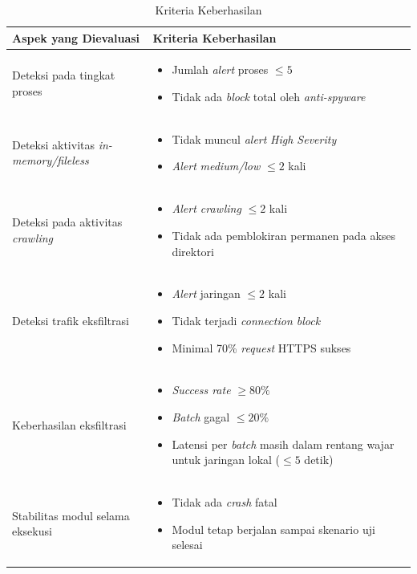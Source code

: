 \begin{table}[H]
\centering
\captionsetup{justification=raggedright,singlelinecheck=false}
\caption{Kriteria Keberhasilan}
\label{tbl:kriteria-keberhasilan}
\begin{tabular}{|p{4.5cm}|p{10.2cm}|}
\hline
\textbf{Aspek yang Dievaluasi} & \textbf{Kriteria Keberhasilan} \\
\hline

Deteksi pada tingkat proses &
\begin{itemize}[leftmargin=*]
    \item Jumlah \textit{alert} proses $\leq 5$ 
    \item Tidak ada \textit{block} total oleh \textit{anti-spyware}
\end{itemize}
\\
\hline

Deteksi aktivitas \textit{in-memory/fileless} &
\begin{itemize}[leftmargin=*]
    \item Tidak muncul \textit{alert} \textit{High Severity}
    \item \textit{Alert} \textit{medium/low} $\leq 2$ kali
\end{itemize}
\\
\hline

Deteksi pada aktivitas \textit{crawling} &
\begin{itemize}[leftmargin=*]
    \item \textit{Alert crawling} $\leq 2$ kali
    \item Tidak ada pemblokiran permanen pada akses direktori
\end{itemize}
\\
\hline

Deteksi trafik eksfiltrasi &
\begin{itemize}[leftmargin=*]
    \item \textit{Alert} jaringan $\leq 2$ kali
    \item Tidak terjadi \textit{connection block}
    \item Minimal 70\% \textit{request} HTTPS sukses
\end{itemize}
\\
\hline

Keberhasilan eksfiltrasi &
\begin{itemize}[leftmargin=*]
    \item \textit{Success rate} $\geq 80\%$
    \item \textit{Batch} gagal $\leq 20\%$
    \item Latensi per \textit{batch} masih dalam rentang wajar untuk jaringan lokal ($\leq 5$ detik)
\end{itemize}
\\
\hline

Stabilitas modul selama eksekusi &
\begin{itemize}[leftmargin=*]
    \item Tidak ada \textit{crash} fatal
    \item Modul tetap berjalan sampai skenario uji selesai
\end{itemize}
\\
\hline

\end{tabular}
\end{table}